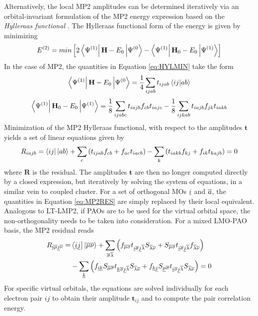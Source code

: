 Alternatively, the local MP2 amplitudes can be determined iteratively via an orbital-invariant formulation of the MP2 energy expression based on the \emph{Hylleraas functional} \cite{Hyl1929,Pul1986}. The  Hylleraas functional form of the energy is given by minimizing 
\begin{equation}
E^{(2)} = min \left[ 2\bra{\Psi^{(1)}} \mathbf{H} - E_0  \ket{\Psi^{(0}} - \bra{\Psi^{(1)}} \mathbf{H}_0 - E_0 \ket{\Psi^{(1)}} \right]
\label{eq:HYLMIN}
\end{equation}
\noindent In the case of MP2, the quantities in Equation \ref{eq:HYLMIN} take the form
\begin{equation}
\bra{\Psi^{(1)}} \mathbf{H} - E_0  \ket{\Psi^{(0}} = \frac{1}{4} \sum_{ijab} t_{ijab} \bra{ij}\ket{ab}
\end{equation}
\begin{equation}
\bra{\Psi^{(1)}} \mathbf{H}_0 - E_0 \ket{\Psi^{(1)}} = \frac{1}{8} \sum_{ijabc} t_{iajb} f_{cb} t_{iajc} - \frac{1}{8} \sum_{ijkab} t_{iajb} f_{jk} t_{iakb}
\end{equation}
\noindent Minimization of the MP2 Hylleraas functional, with respect to the amplitudes $\mathbf{t}$ yields a set of linear equations given by
\begin{equation}
\begin{split}
R_{iajb} = \bra{ij} {} \ket{ab} + \sum_c \left(t_{ijab} f_{cb} + f_{ac} t_{iacb} \right) - \sum_k \left( t_{iakb} f_{kj} + f_{ik} t_{kajb} \right) = 0
\end{split}
\label{eq:MP2RES}
\end{equation}
\noindent where $\mathbf{R}$ is the residual. The amplitudes $\mathbf{t}$ are then no longer computed directly by a closed expression, but iteratively by solving the system of equations, in a similar vein to coupled cluster. %
For a set of orthogonal MOs $\underline{i}$ and $\overline{a}$, the quantities in Equation \ref{eq:MP2RES} are simply replaced by their local equivalent. Analogous to LT-LMP2, if PAOs are to be used for the virtual orbital space, the non-orthogonality needs to be taken into consideration. For a mixed LMO-PAO basis, the MP2 residual reads
\begin{equation}
\begin{split}
R_{\underline{i} \overline{\mu} \underline{j} \overline{\nu}} = & \bra{\underline{i}\underline{j}}{}\ket{\overline{\mu}\overline{\nu}} + \sum_{\overline{\sigma}\overline{\lambda}} \left( f_{\overline{\mu}\overline{\sigma}} t_{\underline{i} \overline{\sigma} \underline{j} \overline{\lambda}} S_{\overline{\lambda}\overline{\nu}} + S_{\overline{\mu}\overline{\sigma}} t_{\underline{i} \overline{\sigma} \underline{j} \overline{\lambda}} f_{\overline{\lambda}\overline{\nu}} \right) \\
&-  \sum_{\underline{k}} \left( f_{\underline{i} \underline{k}} S_{\overline{\mu}\overline{\sigma}} t_{\underline{k} \overline{\sigma} \underline{j} \overline{\lambda}} S_{\overline{\lambda} \overline{\nu}} + f_{\underline{k} \underline{j}} S_{\underline{\mu}\overline{\sigma}} t_{\underline{i} \overline{\sigma} \underline{j} \overline{\lambda}} S_{\overline{\lambda}\overline{\nu}} \right) = 0
\end{split} 
\end{equation}
\noindent For specific virtual orbitals, the equations are solved individually for each electron pair $ij$ to obtain their amplitude $\mathbf{t}_{ij}$ and to compute the pair correlation energy. 

